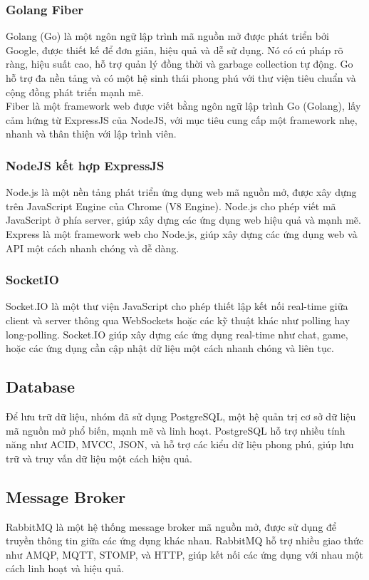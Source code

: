\subsubsection{Golang Fiber}
\noindent Golang (Go) là một ngôn ngữ lập trình mã nguồn mở được phát triển bởi Google, được thiết kế để đơn giản, hiệu quả và dễ sử dụng. Nó có cú pháp rõ ràng, hiệu suất cao, hỗ trợ quản lý đồng thời và garbage collection tự động. Go hỗ trợ đa nền tảng và có một hệ sinh thái phong phú với thư viện tiêu chuẩn và cộng đồng phát triển mạnh mẽ.\\[0.5cm]

\noindent Fiber là một framework web được viết bằng ngôn ngữ lập trình Go (Golang), lấy cảm hứng từ ExpressJS của NodeJS, với mục tiêu cung cấp một framework nhẹ, nhanh và thân thiện với lập trình viên.
\subsubsection{NodeJS kết hợp ExpressJS} 
\noindent Node.js là một nền tảng phát triển ứng dụng web mã nguồn mở, được xây dựng trên JavaScript Engine của Chrome (V8 Engine). Node.js cho phép viết mã JavaScript ở phía server, giúp xây dựng các ứng dụng web hiệu quả và mạnh mẽ. \\[0.5cm]
\noindent Express là một framework web cho Node.js, giúp xây dựng các ứng dụng web và API một cách nhanh chóng và dễ dàng.
\subsubsection{SocketIO}
\noindent Socket.IO là một thư viện JavaScript cho phép thiết lập kết nối real-time giữa client và server thông qua WebSockets hoặc các kỹ thuật khác như polling hay long-polling. Socket.IO giúp xây dựng các ứng dụng real-time như chat, game, hoặc các ứng dụng cần cập nhật dữ liệu một cách nhanh chóng và liên tục.

\subsection{Database}
\noindent Để lưu trữ dữ liệu, nhóm đã sử dụng PostgreSQL, một hệ quản trị cơ sở dữ liệu mã nguồn mở phổ biến, mạnh mẽ và linh hoạt. PostgreSQL hỗ trợ nhiều tính năng như ACID, MVCC, JSON, và hỗ trợ các kiểu dữ liệu phong phú, giúp lưu trữ và truy vấn dữ liệu một cách hiệu quả.

\subsection{Message Broker}
\noindent RabbitMQ là một hệ thống message broker mã nguồn mở, được sử dụng để truyền thông tin giữa các ứng dụng khác nhau. RabbitMQ hỗ trợ nhiều giao thức như AMQP, MQTT, STOMP, và HTTP, giúp kết nối các ứng dụng với nhau một cách linh hoạt và hiệu quả.

